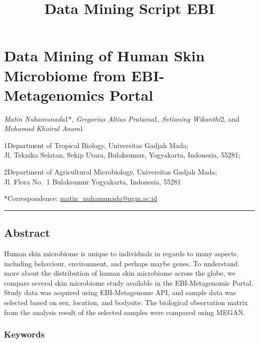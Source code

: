 \documentclass[11pt]{article}
\title{Data Mining Script EBI}
\begin{document}
    
    
    \maketitle
    
    

    
    \hypertarget{data-mining-of-human-skin-microbiome-from-ebi-metagenomics-portal}{%
\section{Data Mining of Human Skin Microbiome from EBI-Metagenomics
Portal}\label{data-mining-of-human-skin-microbiome-from-ebi-metagenomics-portal}}

\emph{Matin Nuhamunada}1*, \emph{Gregorius Altius Pratama}1,
\emph{Setianing Wikanthi}2, and \emph{Mohamad Khoirul Anam}1

1Department of Tropical Biology, Universitas Gadjah Mada;\\
Jl. Teknika Selatan, Sekip Utara, Bulaksumur, Yogyakarta, Indonesia,
55281;

2Department of Agricultural Microbiology, Universitas Gadjah Mada;\\
Jl. Flora No.~1 Bulaksumur Yogyakarta, Indonesia, 55281

*Correspondence:
\href{mailto:matin_nuhamunada@mail.ugm.ac.id}{matin\_nuhamunada@ugm.ac.id}

\begin{center}\rule{0.5\linewidth}{\linethickness}\end{center}

\hypertarget{abstract}{%
\subsection{Abstract}\label{abstract}}

Human skin microbiome is unique to individuals in regards to many
aspects, including behaviour, environment, and perhaps maybe genes. To
understand more about the distribution of human skin microbiome across
the globe, we compare several skin microbiome study available in the
EBI-Metagenomic Portal. Study data was acquired using EBI-Metagenome
API, and sample data was selected based on sex, location, and bodysite.
The biological observation matrix from the analysis result of the
selected samples were compared using MEGAN.

\hypertarget{keywords}{%
\subsubsection{Keywords}\label{keywords}}
\end{document}
